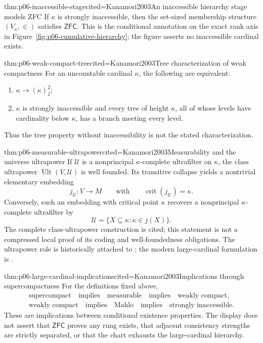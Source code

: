 \begin{hbtheorem}{thm:p06-inaccessible-stage}{cited=Kanamori2003}{An inaccessible hierarchy stage models ZFC}
If \(\kappa\) is strongly inaccessible, then the set-sized membership
structure \((V_\kappa,\in)\) satisfies \(\mathsf{ZFC}\).  This is the
conditional annotation on the exact rank axis in
Figure~\ref{fig:p06-cumulative-hierarchy}; the figure asserts no inaccessible
cardinal exists.
\end{hbtheorem}

\begin{hbtheorem}{thm:p06-weak-compact-tree}{cited=Kanamori2003}{Tree characterization of weak compactness}
For an uncountable cardinal \(\kappa\), the following are equivalent:
\begin{enumerate}
  \item \(\kappa\longrightarrow(\kappa)^2_2\);
  \item \(\kappa\) is strongly inaccessible and every tree of height
        \(\kappa\), all of whose levels have cardinality below \(\kappa\),
        has a branch meeting every level.
\end{enumerate}
Thus the tree property without inaccessibility is not the stated
characterization.
\end{hbtheorem}

\begin{hbtheorem}{thm:p06-measurable-ultrapower}{cited=Kanamori2003}{Measurability and the universe ultrapower}
If \(\mathcal U\) is a nonprincipal \(\kappa\)-complete ultrafilter on
\(\kappa\), the class ultrapower \(\operatorname{Ult}(V,\mathcal U)\) is well
founded.  Its transitive
collapse yields a nontrivial elementary embedding
\[
  j_{\mathcal U}:V\longrightarrow M
  \qquad\text{with}\qquad
  \operatorname{crit}(j_{\mathcal U})=\kappa.
\]
Conversely, such an embedding with critical point \(\kappa\) recovers a
nonprincipal \(\kappa\)-complete ultrafilter by
\[
  \mathcal U=\{X\subseteq\kappa:\kappa\in j(X)\}.
\]
The complete class-ultrapower construction is cited; this statement is not a
compressed local proof of its coding and well-foundedness obligations.
The ultrapower role is historically attached to \cite{Keisler1962}; the
modern large-cardinal formulation is \cite{Kanamori2003}.
\end{hbtheorem}

\begin{hbtheorem}{thm:p06-large-cardinal-implications}{cited=Kanamori2003}{Implications through supercompactness}
For the definitions fixed above,
\[
  \begin{gathered}
  \text{supercompact}
    \quad\text{implies}\quad \text{measurable}
    \quad\text{implies}\quad \text{weakly compact},\\
  \text{weakly compact}
    \quad\text{implies}\quad \text{Mahlo}
    \quad\text{implies}\quad \text{strongly inaccessible}.
  \end{gathered}
\]
These are implications between conditional existence properties.  The display
does not assert that \(\mathsf{ZFC}\) proves any rung exists, that adjacent
consistency strengths are strictly separated, or that the chart exhausts the
large-cardinal hierarchy.
\end{hbtheorem}

